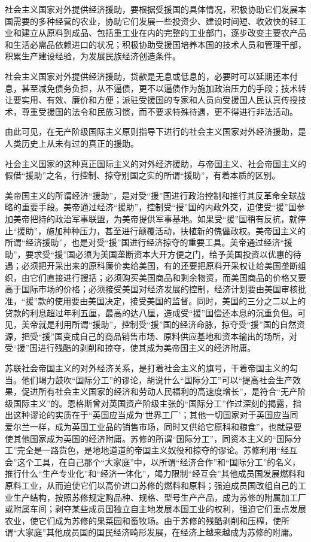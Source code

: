 \documentclass{book}
\begin{document}
社会主义国家对外提供经济援助，要根据受援国的具体情况，积极协助它们发展本国需要的多种经营的农业，协助它们发展一些投资少、建设时间短、收效快的轻工业和建立从原料到成品、包括重工业在内的完整的工业部门，逐步改变主要农产品和生活必需品依赖进口的状况；积极协助受援国培养本国的技术人员和管理干部，积累生产建设经验，为发展民族经济创造条件。

社会主义国家对外提供经济援助，贷款是无息或低息的，必要时可以延期还本付息，甚至减免债务负担，从不逼债，更不以逼债作为施加政治压力的手段；技术转让要实用、有效、廉价和方便；派驻受援国的专家和人员向受援国人民认真传授技术，尊重受援国的法令和民族习惯，而不要求特殊待遇，更不得进行非法活动。

由此可见，在无产阶级国际主义原则指导下进行的社会主义国家对外经济援助，是人类历史上从未有过的真正的援助。

社会主义国家的这种真正国际主义的对外经济援助，与帝国主义、社会帝国主义的假借“援助”之名，行控制、掠夺别国之实的所谓“援助”，有着本质的区别。

美帝国主义的所谓经济“援助”，是对受“援”国进行政治控制和推行其反革命全球战略的重要手段。美帝通过经济“援助”，控制受“授”国的内政外交，迫使受“援”国参加美帝把持的政治军事联盟，为美帝提供军事基地。如果受“援”国稍有反抗，就停止“援助”，施加种种压力，甚至进行颠覆活动，扶植新的傀儡政权。美帝国主义的所谓“经济援助”，也是对受“援”国进行经济掠夺的重要工具。美帝通过经济“援助”，要求受“援”国必须为美国垄断资本大开方便之门，给予美国投资以优惠的待遇；必须把开采出来的原科廉价卖给美国，有的还要把原料开采权让给美国垄断组织，由它们直接进行搜括；必须购买美国商品和剩余物资，而美国商品的价格又要高于国际市场的价格；必须接受美国对经济发展的控制，经济计划要由美国审核批准，“援”款的使用要由美国决定，接受美国的监督。同时，美国的三分之二以上的贷款的利息超过年利五厘，最高的达八厘，造成受“援”国偿还本息的沉重负但。可见，美帝就是利用所谓“援助”，控制受“援”国的经济命脉，掠夺受“援”国的自然资源，把受“援”国变成自己的商品销售市场、原料供应基地和资本输出的场所，对受“援”国进行残酷的剥削和掠夺，使其成为美帝国主义的经济附庸。

苏联社会帝国主义的对外经济关系，是打着社会主义的旗号，干着帝国主义的勾当。他们竭力鼓吹“国际分工”的谬论，胡说什么“国际分工”可以“提高社会生产效果，促进所有社会主义国家的经济和劳动人民福利的高速度增长”，是符合“无产阶级国际主义”的。恩格斯曾对英国资产阶级主张的“国际分工”作过深刻的揭露，指出这种谬论的实质在于“英国应当成为‘世界工厂’；其他一切国家对于英国应当同爱尔兰一样，成为英国工业品的销售市场，同时又供给它原科和粮食”，也就是要使其他国家成为英国的经济附庸。苏修的所谓“国际分工”，同资本主义的“国际分工”完全是一路货色，是地地道道的帝国主义奴役和掠夺的谬论。苏修利用“经互会”这个工具，在自己那个“大家庭”中，以所谓“经济合作”和“国际分工”的名义，推行什么“生产专业化”和“经济一体化”，竭力限制“经互会”其他成员国发展燃料和原料工业，从而迫使它们以高价进口苏修的燃料和原料；强迫成员国改组自己的工业生产结构，按照苏修规定购品种、规格、型号生产产品，成为苏修的附属加工厂或附属车间；剥夺某些成员国独立自主地发展本国工业的权利，强迫它们重点发展农业，使它们成为苏修的果菜园和畜牧场。由于苏修的残酷剥削和压榨，使所谓“大家庭”其他成员国的国民经济畸形发展，在经济上越来越成为苏修的附庸。
\end{document}
